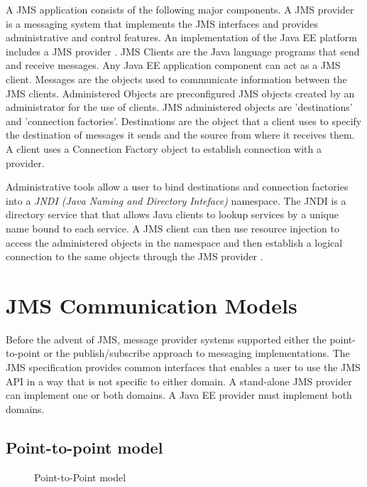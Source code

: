 \documentclass[9pt,twocolumn,twoside]{../../styles/osajnl}
\begin{document}
A JMS application consists of the following major components.  A JMS
provider is a messaging system that implements the JMS interfaces and
provides administrative and control features. An implementation of the
Java EE platform includes a JMS provider
\cite{www-jms-tutorialoracle}. JMS Clients are the Java language
programs that send and receive messages. Any Java EE application
component can act as a JMS client.  Messages are the objects used to
communicate information between the JMS clients.  Administered Objects
are preconfigured JMS objects created by an administrator for the use
of clients.  JMS administered objects are 'destinations' and
'connection factories'. Destinations are the object that a client uses
to specify the destination of messages it sends and the source from
where it receives them.  A client uses a Connection Factory object to
establish connection with a provider.

Administrative tools allow a user to bind destinations and connection
factories into a \emph{JNDI (Java Naming and Directory Inteface)}
\cite{www-jndi-wiki} namespace. The JNDI is a directory service that
that allows Java clients to lookup services by a unique name bound to
each service. A JMS client can then use resource injection to access
the administered objects in the namespace and then establish a logical
connection to the same objects through the JMS provider
\cite{www-jms-tutorialoracle}.


\section{JMS Communication Models}

Before the advent of JMS, message provider systems supported either
the point-to-point or the publish/subscribe approach to messaging
implementations. The JMS specification provides common interfaces that
enables a user to use the JMS API in a way that is not specific to
either domain. A stand-alone JMS provider can implement one or both
domains. A Java EE provider must implement both domains.

\subsection{Point-to-point model}

\begin{figure}[htbp]
\centering
{}
\caption{Point-to-Point model \cite{www-jms-tutorialoracle}}
\label{fig:Point-to-Point messaging}
\end{figure}
\end{document}
